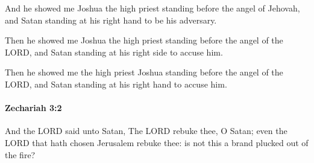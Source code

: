 			\begin{versebox}
					\item[BHS] 
					\item[LXX] 
					\item[ASV] And he showed me Joshua the high priest standing before the angel of Jehovah, and Satan standing at his right hand to be his adversary.
					\item[NIV] Then he showed me Joshua the high priest standing before the angel of the LORD, and Satan standing at his right side to accuse him.
					\item[NRSV] Then he showed me the high priest Joshua standing before the angel of the LORD, and Satan standing at his right hand to accuse him.
			\end{versebox}

		\paragraph{Zechariah 3:2} %
			\label{ZECHARIAH-3-2}

			And the LORD said unto Satan, The LORD rebuke thee, O Satan; even the LORD that hath chosen Jerusalem rebuke thee: is not this a brand plucked out of the fire?

